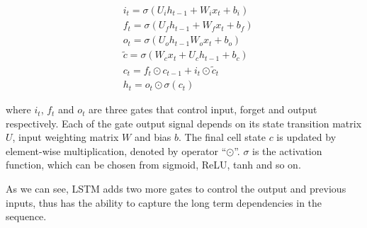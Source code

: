 \documentclass[11pt]{article}
\begin{document}
\begin{align*}
	&i_t = \sigma(U_ih_{t-1}+W_ix_t + b_i)\\
    &f_t = \sigma(U_fh_{t-1}+W_fx_t + b_f) \\
    &o_t = \sigma(U_oh_{t-1}W_ox_t + b_o) \\
	&\tilde{c} = \sigma(W_cx_t + U_ch_{t-1}+b_c)\\
	&c_t = f_t\odot c_{t-1} + i_t \odot \tilde{c}_t \\
	&h_t = o_t\odot \sigma(c_t)
\end{align*}

where $i_t$, $f_t$ and $o_t$ are three gates that control input, forget and output respectively. Each of the gate output signal depends on its state transition matrix $U$, input weighting matrix $W$ and bias $b$. The final cell state $c$ is updated by element-wise multiplication, denoted by operator ``$\odot$''. $\sigma$ is the activation function, which can be chosen from sigmoid, ReLU, tanh and so on. 

As we can see, LSTM adds two more gates to control the output and previous inputs, thus has the ability to capture the long term dependencies in the sequence. 






\end{document}
